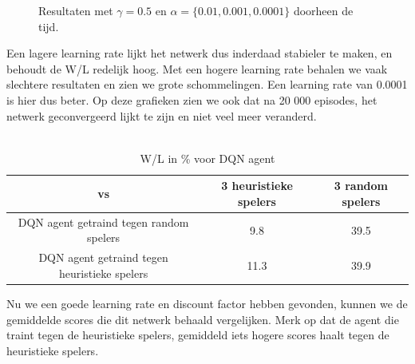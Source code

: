 \documentclass[11pt]{article}
\begin{document}
\begin{figure}[H]
    \centering
    \qquad
    \caption{Resultaten met $\gamma = 0.5$ en $\alpha = \{0.01, 0.001, 0.0001\}$ doorheen de tijd.}
    \label{fig:example}
\end{figure}
Een lagere learning rate lijkt het netwerk dus inderdaad stabieler te maken, en behoudt de W/L redelijk hoog. Met een hogere learning rate behalen we vaak slechtere resultaten en zien we grote schommelingen. Een learning rate van 0.0001 is hier dus beter. Op deze grafieken zien we ook dat na 20 000 episodes, het netwerk geconvergeerd lijkt te zijn en niet veel meer veranderd. \\\\
\begin{table}[H]
        \centering
        \begin{tabular}{|c|c|c|}
                \hline
                  vs           & 3 heuristieke spelers & 3 random spelers \\
                \hline
                 DQN agent getraind tegen random spelers & 9.8 & 39.5\\
                 DQN agent getraind tegen heuristieke spelers & 11.3 & 39.9\\
                \hline
        \end{tabular}
        \caption{W/L in \% voor DQN agent}
\end{table}
Nu we een goede learning rate en discount factor hebben gevonden, kunnen we de gemiddelde scores die dit netwerk behaald vergelijken. Merk op dat de agent die traint tegen de heuristieke spelers, gemiddeld iets hogere scores haalt tegen de heuristieke spelers. \\
\end{document}
